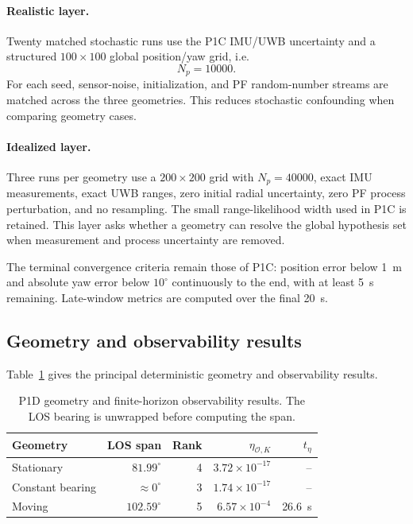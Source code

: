 \paragraph{Realistic layer.}
Twenty matched stochastic runs use the P1C IMU/UWB uncertainty and a structured $100\times100$ global position/yaw grid, i.e.
\begin{equation}
    N_p=10000.
\end{equation}
For each seed, sensor-noise, initialization, and PF random-number streams are matched across the three geometries. This reduces stochastic confounding when comparing geometry cases.

\paragraph{Idealized layer.}
Three runs per geometry use a $200\times200$ grid with $N_p=40000$, exact IMU measurements, exact UWB ranges, zero initial radial uncertainty, zero PF process perturbation, and no resampling. The small range-likelihood width used in P1C is retained. This layer asks whether a geometry can resolve the global hypothesis set when measurement and process uncertainty are removed.

The terminal convergence criteria remain those of P1C: position error below \SI{1}{m} and absolute yaw error below $10^{\circ}$ continuously to the end, with at least \SI{5}{s} remaining. Late-window metrics are computed over the final \SI{20}{s}.

\subsection{Geometry and observability results}
Table~\ref{tab:p1d_observability} gives the principal deterministic geometry and observability results.
\begin{table}[ht]
\centering
\caption{P1D geometry and finite-horizon observability results. The LOS bearing is unwrapped before computing the span.}
\label{tab:p1d_observability}
\begin{tabular}{lrrrr}
\toprule
Geometry & LOS span & Rank & $\eta_{\mathcal O,K}$ & $t_{\eta}$\\
\midrule
Stationary & $81.99^{\circ}$ & 4 & $3.72\times10^{-17}$ & --\\
Constant bearing & $\approx0^{\circ}$ & 3 & $1.74\times10^{-17}$ & --\\
Moving & $102.59^{\circ}$ & 5 & $6.57\times10^{-4}$ & \SI{26.6}{s}\\
\bottomrule
\end{tabular}
\end{table}

